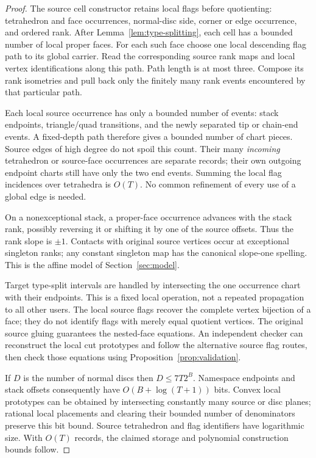 \documentclass[11pt]{article}
\theoremstyle{definition}\newtheorem{definition}[theorem]{Definition}
\theoremstyle{remark}\newtheorem{remark}[theorem]{Remark}
\begin{document}
\begin{proof}
The source cell constructor retains local flags before quotienting: tetrahedron and face occurrences, normal-disc side, corner or edge occurrence, and ordered rank. After Lemma~\ref{lem:type-splitting}, each cell has a bounded number of local proper faces. For each such face choose one local descending flag path to its global carrier. Read the corresponding source rank maps and local vertex identifications along this path. Path length is at most three. Compose its rank isometries and pull back only the finitely many rank events encountered by that particular path.

Each local source occurrence has only a bounded number of events: stack endpoints, triangle/quad transitions, and the newly separated tip or chain-end events. A fixed-depth path therefore gives a bounded number of chart pieces. Source edges of high degree do not spoil this count. Their many \emph{incoming} tetrahedron or source-face occurrences are separate records; their own outgoing endpoint charts still have only the two end events. Summing the local flag incidences over tetrahedra is \(O(T)\). No common refinement of every use of a global edge is needed.

On a nonexceptional stack, a proper-face occurrence advances with the stack rank, possibly reversing it or shifting it by one of the source offsets. Thus the rank slope is \(\pm1\). Contacts with original source vertices occur at exceptional singleton ranks; any constant singleton map has the canonical slope-one spelling. This is the affine model of Section~\ref{sec:model}.

Target type-split intervals are handled by intersecting the one occurrence chart with their endpoints. This is a fixed local operation, not a repeated propagation to all other users. The local source flags recover the complete vertex bijection of a face; they do not identify flags with merely equal quotient vertices. The original source gluing guarantees the nested-face equations. An independent checker can reconstruct the local cut prototypes and follow the alternative source flag routes, then check those equations using Proposition~\ref{prop:validation}.

If \(D\) is the number of normal discs then \(D\leq7T2^B\). Namespace endpoints and stack offsets consequently have \(O(B+\log(T+1))\) bits. Convex local prototypes can be obtained by intersecting constantly many source or disc planes; rational local placements and clearing their bounded number of denominators preserve this bit bound. Source tetrahedron and flag identifiers have logarithmic size. With \(O(T)\) records, the claimed storage and polynomial construction bounds follow.
\end{proof}
\end{document}
